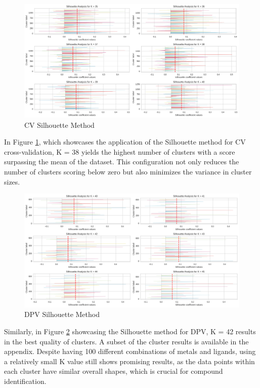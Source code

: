 \begin{figure}[h!]
  \centering
    \includegraphics[width=1.0\textwidth]{figures/cv_silhouette.png}
    \caption{CV Silhouette Method}
    \label{cv_silhouette}
\end{figure}
In Figure \ref{cv_silhouette}, which showcases the application of the Silhouette method for CV cross-validation, K = 38 yields the highest number of clusters with a score surpassing the mean of the dataset. This configuration not only reduces the number of clusters scoring below zero but also minimizes the variance in cluster sizes.
\begin{figure}[h!]
  \centering
    \includegraphics[width=1.0\textwidth]{figures/dpv_silhouette.png}
    \caption{DPV Silhouette Method}
    \label{dpv_silhouette}
\end{figure}
Similarly, in Figure \ref{dpv_silhouette} showcasing the Silhouette method for DPV, K = 42 results in the best quality of clusters. A subset of the cluster results is available in the appendix. Despite having 100 different combinations of metals and ligands, using a relatively small K value still shows promising results, as the data points within each cluster have similar overall shapes, which is crucial for compound identification. 

